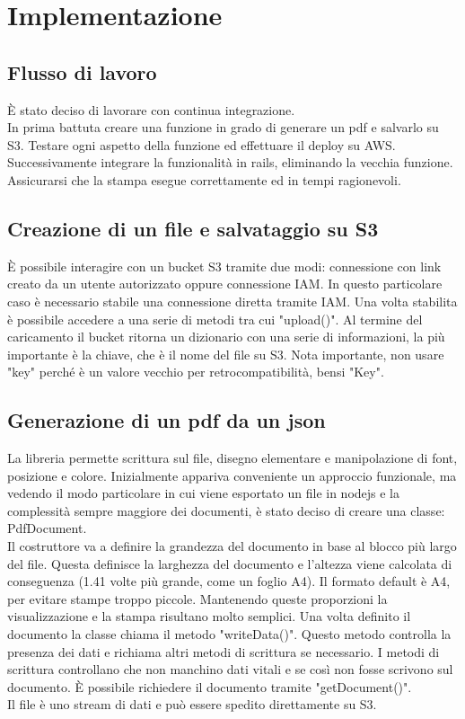 \documentclass[12pt]{article}
\begin{document}
\section{Implementazione}
\subsection{Flusso di lavoro}
È stato deciso di lavorare con continua integrazione. 
\\ In prima battuta creare una funzione in grado di generare un pdf e salvarlo 
su S3. Testare ogni aspetto della funzione ed effettuare il deploy su AWS. 
\\ Successivamente integrare la funzionalità in rails, eliminando la vecchia 
funzione. Assicurarsi che la stampa esegue correttamente ed in tempi ragionevoli.

\subsection{Creazione di un file e salvataggio su S3}
È possibile interagire con un bucket S3 tramite due modi: connessione con link 
creato da un utente autorizzato oppure connessione IAM. In questo particolare 
caso è necessario stabile una connessione diretta tramite IAM. Una volta stabilita 
è possibile accedere a una serie di metodi tra cui "upload()". Al termine del 
caricamento il bucket ritorna un dizionario con una serie di informazioni, la 
più importante è la chiave, che è il nome del file su S3. Nota importante, 
non usare "key" perché è un valore vecchio per retrocompatibilità, bensi "Key". 

\subsection{Generazione di un pdf da un json}
La libreria permette scrittura sul file, disegno elementare e manipolazione di 
font, posizione e colore.
Inizialmente appariva conveniente un approccio funzionale, ma vedendo il modo 
particolare in cui viene esportato un file in nodejs e la complessità sempre 
maggiore dei documenti, è stato deciso di creare una classe: PdfDocument. 
\\
Il costruttore va a definire la grandezza del documento in base al blocco più 
largo del file.
Questa definisce la larghezza del documento e l'altezza viene calcolata di
conseguenza (1.41 volte più grande, come un foglio A4).
Il formato default è A4, per evitare stampe troppo piccole.
Mantenendo queste proporzioni la visualizzazione e la stampa risultano molto 
semplici.
Una volta definito il documento la classe chiama il metodo "writeData()".
Questo metodo controlla la presenza dei dati e richiama altri metodi di scrittura 
se necessario.
I metodi di scrittura controllano che non manchino dati vitali e se così non fosse 
scrivono sul documento. 
È possibile richiedere il documento tramite "getDocument()". 
\\ Il file è uno stream di dati e può essere spedito direttamente su S3. 
\end{document}
